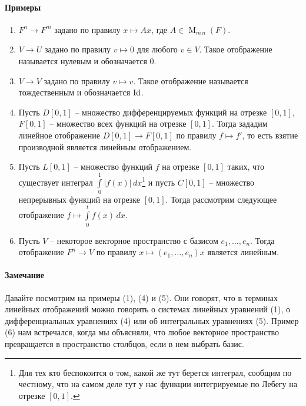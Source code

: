 \paragraph{Примеры}
\begin{enumerate}
\item $F^n \to F^m$ задано по правилу $x\mapsto Ax$, где $A\in \operatorname{M}_{m\,n}(F)$.

\item $V\to U$ задано по правилу $v\mapsto 0$ для любого $v\in V$. Такое отображение называется нулевым и обозначается $0$.

\item $V\to V$ задано по правилу $v\mapsto v$. Такое отображение называется тождественным и обозначается $\operatorname{Id}$.

\item Пусть $D[0,1]$ -- множество дифференцируемых функций на отрезке $[0,1]$, $F[0,1]$ -- множество всех функций на отрезке $[0,1]$. Тогда зададим линейное отображение $D[0,1]\to F[0,1]$ по правилу $f\mapsto f'$, то есть взятие производной является линейным отображением.

\item Пусть $L[0,1]$ -- множество функций $f$ на отрезке $[0,1]$ таких, что существует интеграл $\int\limits_0^1 |f(x)|\,dx$\footnote{Для тех кто беспокоится о том, какой же тут берется интеграл, сообщим по честному, что на самом деле тут у нас функции интегрируемые по Лебегу на отрезке $[0,1]$.} и пусть $C[0,1]$ -- множество непрерывных функций на отрезке $[0,1]$. Тогда рассмотрим следующее отображение $f\mapsto \int\limits_0^t f(x)\,dx$.

\item Пусть $V$ -- некоторое векторное пространство с базисом $e_1,\ldots, e_n$. Тогда отображение $F^n \to V$ по правилу $x \mapsto (e_1,\ldots,e_n)x$ является линейным.
\end{enumerate}

\paragraph{Замечание}

Давайте посмотрим на примеры (1), (4) и (5). Они говорят, что в терминах линейных отображений можно говорить о системах линейных уравнений (1), о дифференциальных уравнениях (4) или об интегральных уравнениях (5). Пример (6) нам встречался, когда мы объясняли, что любое векторное пространство превращается в пространство столбцов, если в нем выбрать базис.


